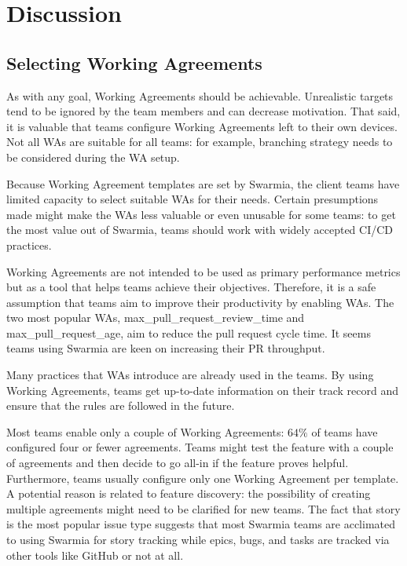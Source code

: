 \chapter{Discussion}

\section{Selecting Working Agreements}

As with any goal, Working Agreements should be achievable. Unrealistic targets tend to be ignored by the team members and can decrease motivation. That said, it is valuable that teams configure Working Agreements left to their own devices. Not all WAs are suitable for all teams: for example, branching strategy needs to be considered during the WA setup.  

Because Working Agreement templates are set by Swarmia, the client teams have limited capacity to select suitable WAs for their needs. Certain presumptions made might make the WAs less valuable or even unusable for some teams: to get the most value out of Swarmia, teams should work with widely accepted CI/CD practices. 

Working Agreements are not intended to be used as primary performance metrics but as a tool that helps teams achieve their objectives. Therefore, it is a safe assumption that teams aim to improve their productivity by enabling WAs. The two most popular WAs, max\_pull\_request\_review\_time and max\_pull\_request\_age, aim to reduce the pull request cycle time. It seems teams using Swarmia are keen on increasing their PR throughput. 

Many practices that WAs introduce are already used in the teams. By using Working Agreements, teams get up-to-date information on their track record and ensure that the rules are followed in the future. 

Most teams enable only a couple of Working Agreements: $64\%$ of teams have configured four or fewer agreements. Teams might test the feature with a couple of agreements and then decide to go all-in if the feature proves helpful. Furthermore, teams usually configure only one Working Agreement per template. A potential reason is related to feature discovery: the possibility of creating multiple agreements might need to be clarified for new teams. The fact that story is the most popular issue type suggests that most Swarmia teams are acclimated to using Swarmia for story tracking while epics, bugs, and tasks are tracked via other tools like GitHub or not at all.

